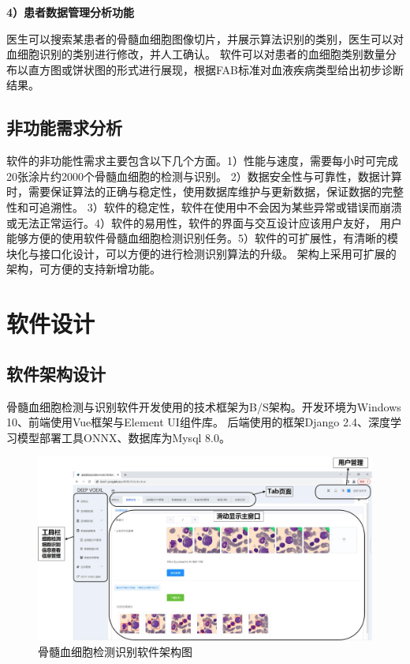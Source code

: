 \textbf{4）患者数据管理分析功能}

医生可以搜索某患者的骨髓血细胞图像切片，并展示算法识别的类别，医生可以对血细胞识别的类别进行修改，并人工确认。
软件可以对患者的血细胞类别数量分布以直方图或饼状图的形式进行展现，根据FAB标准对血液疾病类型给出初步诊断结果。

\subsection{非功能需求分析}
软件的非功能性需求主要包含以下几个方面。1）性能与速度，需要每小时可完成20张涂片约2000个骨髓血细胞的检测与识别。
2）数据安全性与可靠性，数据计算时，需要保证算法的正确与稳定性，使用数据库维护与更新数据，保证数据的完整性和可追溯性。
3）软件的稳定性，软件在使用中不会因为某些异常或错误而崩溃或无法正常运行。4）软件的易用性，软件的界面与交互设计应该用户友好，
用户能够方便的使用软件骨髓血细胞检测识别任务。5）软件的可扩展性，有清晰的模块化与接口化设计，可以方便的进行检测识别算法的升级。
架构上采用可扩展的架构，可方便的支持新增功能。

\section{软件设计}

\subsection{软件架构设计}
骨髓血细胞检测与识别软件开发使用的技术框架为B/S架构。开发环境为Windows 10、前端使用Vue框架与Element UI组件库。
后端使用的框架Django 2.4、深度学习模型部署工具ONNX、数据库为Mysql 8.0。

\begin{figure}[htbp]                     
  \centering                      
  \includegraphics[width=0.99\linewidth]{software.jpg}                      
  \caption{骨髓血细胞检测识别软件架构图}                      
  \label{fig:software}       
\end{figure}

